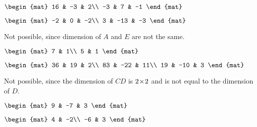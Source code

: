 \begin{Answer}
\Question
$
\begin{mat}
16 & -3 & 2\\
-3 & 7 & -1
\end{mat}
$

\Question 
$
\begin{mat}
-2 & 0 & -2\\
3 & -13 & -3
\end{mat}
$

\Question Not possible, since dimension of $A$ and $E$ are not the same.

\Question
$
\begin{mat}
7 & 1\\
5 & 1
\end{mat}
$

\Question 
$
\begin{mat}
36 & 19 & 2\\
83 & -22 & 11\\
19 & -10 & 3
\end{mat}
$

\Question Not possible, since the dimension of $CD$ is $2 \! \times \! 2$ and 
is not equal to the dimension of $D$.

\Question
$
\begin{mat}
9 & -7 & 3
\end{mat}
$

\Question
$
\begin{mat}
4 & -2\\
-6 & 3
\end{mat}
$
\end{Answer}
